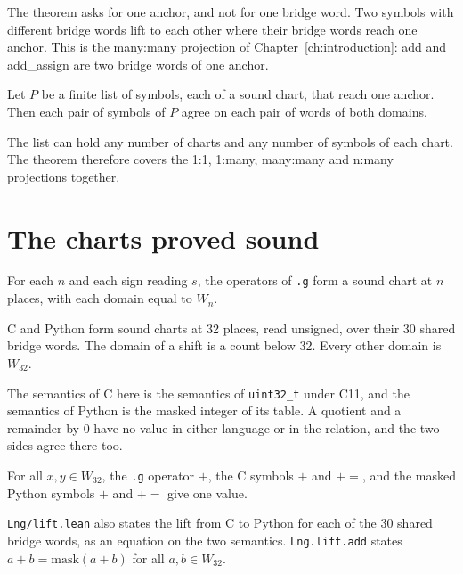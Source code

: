 The theorem asks for one anchor, and not for one bridge word. Two symbols with different bridge words lift to
each other where their bridge words reach one anchor. This is the many:many projection of
Chapter~\ref{ch:introduction}: add and add\_assign are two bridge words of one anchor.

\begin{theorem}
Let $P$ be a finite list of symbols, each of a sound chart, that reach one anchor. Then each pair of symbols of $P$
agree on each pair of words of both domains.
\end{theorem}

The list can hold any number of charts and any number of symbols of each chart. The theorem therefore covers the
1:1, 1:many, many:many and n:many projections together.

\section{The charts proved sound}

\begin{theorem}[\texttt{g}]
For each $n$ and each sign reading $s$, the operators of \texttt{.g} form a sound chart at $n$ places, with each
domain equal to $W_n$.
\end{theorem}

\begin{theorem}
C and Python form sound charts at 32 places, read unsigned, over their 30 shared bridge words. The domain of a
shift is a count below 32. Every other domain is $W_{32}$.
\end{theorem}

The semantics of C here is the semantics of \texttt{uint32\_t} under C11, and the semantics of Python is the
masked integer of its table. A quotient and a remainder by 0 have no value in either language or in the relation,
and the two sides agree there too.

\begin{theorem}
For all $x, y \in W_{32}$, the \texttt{.g} operator $+$, the C symbols $+$ and $+{=}$, and the masked Python symbols
$+$ and $+{=}$ give one value.
\end{theorem}

\texttt{Lng/lift.lean} also states the lift from C to Python for each of the 30 shared bridge words, as an
equation on the two semantics. \texttt{Lng.lift.add} states $a + b = \mathrm{mask}(a + b)$ for all
$a, b \in W_{32}$.

